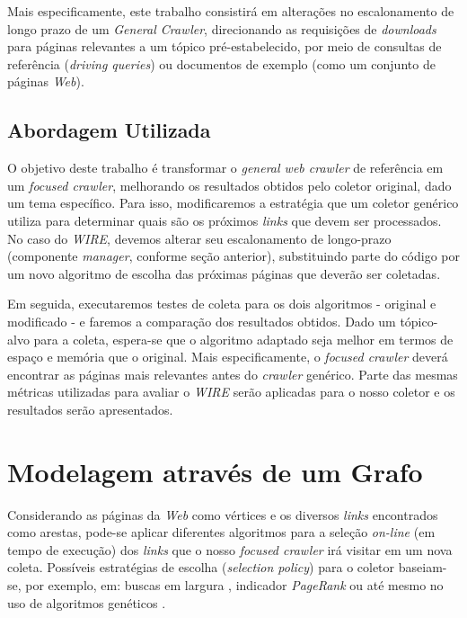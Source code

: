 \documentclass[a4paper,12pt,titlepage]{article}
\begin{document}
Mais especificamente, este trabalho consistirá em alterações no escalonamento de longo prazo de um \textit{General Crawler}, direcionando as requisições de \textit{downloads} para páginas relevantes a um tópico pré-estabelecido, por meio de consultas de referência (\textit{driving queries}) ou documentos de exemplo (como um conjunto de páginas \textit{Web}).


\subsection{Abordagem Utilizada}

O objetivo deste trabalho é transformar o \textit{general web crawler} de referência em um \textit{focused crawler}, melhorando os resultados obtidos pelo coletor original, dado um tema específico. Para isso, modificaremos a estratégia que um coletor genérico utiliza para determinar quais são os próximos \textit{links} que devem ser processados. No caso do \textit{WIRE}, devemos alterar seu escalonamento de longo-prazo (componente \textit{manager}, conforme seção anterior), substituindo parte do código por um novo algoritmo de escolha das próximas páginas que deverão ser coletadas.

Em seguida, executaremos testes de coleta para os dois algoritmos - original e modificado - e faremos a comparação dos resultados obtidos. Dado um tópico-alvo para a coleta, espera-se que o algoritmo adaptado seja melhor em termos de espaço e memória que o original. Mais especificamente, o \textit{focused crawler} deverá encontrar as páginas mais relevantes antes do \textit{crawler} genérico. Parte das mesmas métricas utilizadas para avaliar o \textit{WIRE} serão aplicadas para o nosso coletor e os resultados serão apresentados.


\section{Modelagem através de um Grafo}
Considerando as páginas da \textit{Web} como vértices e os diversos \textit{links} encontrados como arestas, pode-se aplicar diferentes algoritmos para a seleção \textit{on-line} (em tempo de execução) dos \textit{links} que o nosso \textit{focused crawler} irá visitar em um nova coleta. Possíveis estratégias de escolha (\textit{selection policy}) para o coletor baseiam-se, por exemplo, em: buscas em largura \cite{najork}, indicador \textit{PageRank} \cite{cho} ou até mesmo no uso de algoritmos genéticos \cite{johnson}. 
\end{document}
